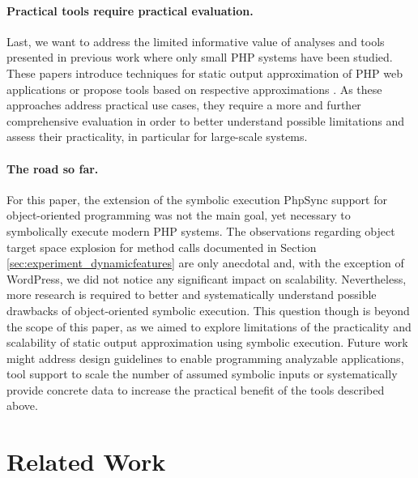 \documentclass[sigconf]{acmart}
\renewcommand{\sf}[1]{\textsf{#1}}
\begin{document}
\paragraph{Practical tools require practical evaluation.}
Last, we want to address the limited informative value of analyses and tools
presented in previous work
\cite{Nguyen:2011:AFH:2190078.2190142,Nguyen:2014:BCG:2635868.2635928,Nguyen:2015:CPS:2786805.2786872,Nguyen:2015:VIS:2819009.2819140,minamide_static_2005,wassermann2007sound}
where only small PHP systems have been studied. These papers introduce
techniques for static output approximation of PHP web applications
\cite{minamide_static_2005,Nguyen:2014:BCG:2635868.2635928,wang_automating_2012} or propose tools
based on respective approximations
\cite{Nguyen:2011:AFH:2190078.2190142,Nguyen:2014:BCG:2635868.2635928,Nguyen:2015:CPS:2786805.2786872,Nguyen:2015:VIS:2819009.2819140,wassermann2007sound,wassermann_static_2008}.
As these approaches address practical use cases, they require a more and further comprehensive evaluation in order to  better understand possible limitations and assess their practicality, in particular for large-scale systems.

\paragraph{The road so far.}
For this paper, the extension of the symbolic execution \sf{PhpSync} \cite{Nguyen:2014:BCG:2635868.2635928}
support for object-oriented programming was not the main goal, yet necessary to
symbolically execute modern PHP systems. The observations regarding object
target space explosion for method calls documented in Section
\ref{sec:experiment_dynamicfeatures} are only anecdotal and, with the exception
of \sf{WordPress}, we did not notice any significant impact on scalability.
Nevertheless, more research is required to better and systematically understand
possible drawbacks of object-oriented symbolic execution. 
This question though is beyond the scope of this paper, as we aimed
to explore limitations of the practicality and scalability of static output
approximation using symbolic execution. Future work might address design
guidelines to enable programming analyzable applications, tool support to scale
the number of assumed symbolic inputs or systematically provide concrete data
to increase the practical benefit of the tools described above.


\section{Related Work} \label{sec:related_work}
\end{document}
